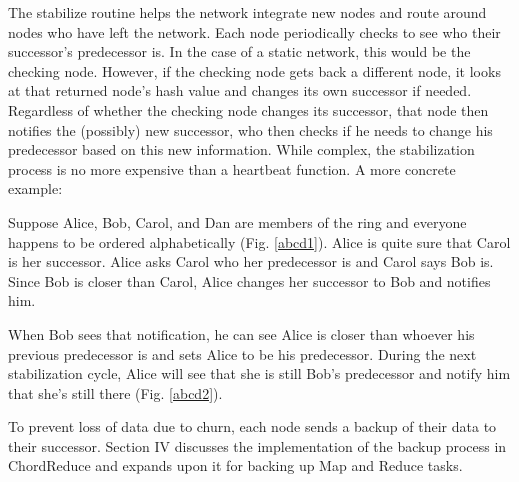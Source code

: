 \documentclass[10pt, conference, compsocconf]{IEEEtran}
\begin{document}
The stabilize routine helps the network integrate new nodes and route around nodes who have left the network. Each node periodically checks to see who their successor's predecessor is.  In the case of a static network, this would be the checking node.  However, if the checking node gets back a different node, it looks at that returned node's hash value and changes its own successor if needed.  Regardless of whether the checking node changes its successor, that node then notifies the (possibly) new successor,  who then checks if he needs to change his predecessor based on this new information.  While complex, the stabilization process is no more expensive than a heartbeat function.  A more concrete example:


Suppose Alice, Bob, Carol, and Dan are members of the ring and everyone happens to be ordered alphabetically (Fig. \ref{abcd1}). Alice is quite sure that Carol is her successor.  Alice asks Carol who her predecessor is and Carol says Bob is.  Since Bob is closer than Carol, Alice changes her successor to Bob and notifies him.  

When Bob sees that notification, he can see Alice is closer than whoever his previous predecessor is and sets Alice to be his predecessor.  During the next stabilization cycle, Alice will see that she is still Bob's predecessor and notify him that she's still there (Fig. \ref{abcd2}).

To prevent loss of data due to churn, each node sends a backup of their data to their successor.  Section IV discusses the implementation of the backup process in ChordReduce and expands upon it for backing up Map and Reduce tasks.




\end{document}
